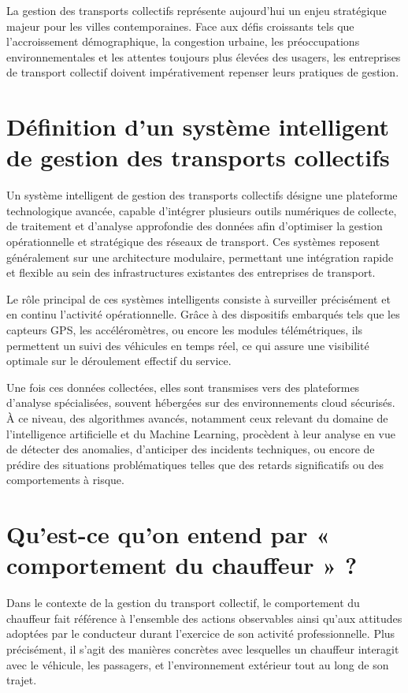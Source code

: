\documentclass[a4paper, 12pt]{book}
\begin{document}
La gestion des transports collectifs représente aujourd'hui un enjeu stratégique majeur pour les villes contemporaines. Face aux défis croissants tels que l'accroissement démographique, la congestion urbaine, les préoccupations environnementales et les attentes toujours plus élevées des usagers, les entreprises de transport collectif doivent impérativement repenser leurs pratiques de gestion.

\section{Définition d'un système intelligent de gestion des transports collectifs}

Un système intelligent de gestion des transports collectifs désigne une plateforme technologique avancée, capable d'intégrer plusieurs outils numériques de collecte, de traitement et d'analyse approfondie des données afin d'optimiser la gestion opérationnelle et stratégique des réseaux de transport. Ces systèmes reposent généralement sur une architecture modulaire, permettant une intégration rapide et flexible au sein des infrastructures existantes des entreprises de transport.

Le rôle principal de ces systèmes intelligents consiste à surveiller précisément et en continu l'activité opérationnelle. Grâce à des dispositifs embarqués tels que les capteurs GPS, les accéléromètres, ou encore les modules télémétriques, ils permettent un suivi des véhicules en temps réel, ce qui assure une visibilité optimale sur le déroulement effectif du service.

Une fois ces données collectées, elles sont transmises vers des plateformes d'analyse spécialisées, souvent hébergées sur des environnements cloud sécurisés. À ce niveau, des algorithmes avancés, notamment ceux relevant du domaine de l'intelligence artificielle et du Machine Learning, procèdent à leur analyse en vue de détecter des anomalies, d'anticiper des incidents techniques, ou encore de prédire des situations problématiques telles que des retards significatifs ou des comportements à risque.

\section{Qu'est-ce qu'on entend par « comportement du chauffeur » ?}

Dans le contexte de la gestion du transport collectif, le comportement du chauffeur fait référence à l'ensemble des actions observables ainsi qu'aux attitudes adoptées par le conducteur durant l'exercice de son activité professionnelle. Plus précisément, il s'agit des manières concrètes avec lesquelles un chauffeur interagit avec le véhicule, les passagers, et l'environnement extérieur tout au long de son trajet.
\end{document}

